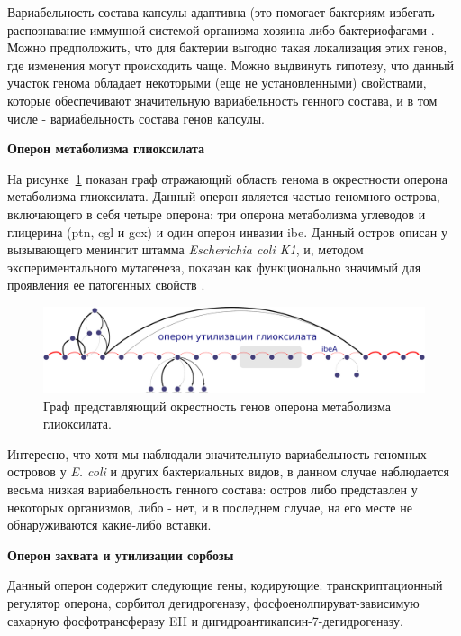 Вариабельность состава капсулы адаптивна (это помогает бактериям избегать распознавание иммунной системой организма-хозяина либо бактериофагами \cite{cress2014masquerading, lukavcova2008role}. Можно предположить, что для бактерии выгодно такая локализация этих генов, где изменения могут происходить чаще. Можно выдвинуть гипотезу, что данный участок генома обладает некоторыми (еще не установленными) свойствами, которые обеспечивают значительную вариабельность генного состава, и в том числе - вариабельность состава генов капсулы.

\textbf{Оперон метаболизма глиоксилата}

На рисунке~\ref{img:glioxilate} показан граф отражающий область генома в окрестности оперона метаболизма глиоксилата. Данный оперон является частью геномного острова, включающего в себя четыре оперона: три оперона метаболизма углеводов и глицерина (ptn, cgl и gcx) и один оперон инвазии ibe. Данный остров описан у вызывающего менингит штамма \textit{Escherichia coli K1}, и, методом экспериментального мутагенеза, показан как функционально значимый для проявления ее патогенных свойств \cite{huang2001novel}. 

\begin{figure}[!ht] 
  \center
    \includegraphics[width=\textwidth]{Dissertation/images/subgraphs/glyoxilate_metabolism_operon_crop.png}
  \caption{Граф представляющий окрестность генов оперона метаболизма глиоксилата. }
  \label{img:glioxilate} 
\end{figure}


Интересно, что хотя мы наблюдали значительную вариабельность геномных островов у \textit{E. coli} и других бактериальных видов, в данном случае наблюдается весьма низкая вариабельность генного состава: остров либо представлен у некоторых организмов, либо - нет, и в последнем случае, на его месте не обнаруживаются какие-либо вставки.

\textbf{Оперон захвата и утилизации сорбозы}

Данный оперон содержит следующие гены, кодирующие: транскриптационный регулятор оперона, сорбитол дегидрогеназу, фосфоенолпируват-зависимую сахарную фосфотрансферазу EII и дигидроантикапсин-7-дегидрогеназу.

